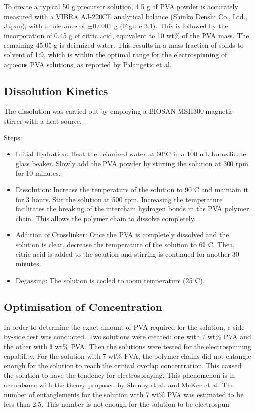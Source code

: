 \documentclass[12pt,a4paper]{report}
\begin{document}
To create a typical 50 g precursor solution, 4.5 g of PVA powder is accurately measured with a VIBRA AJ-220CE analytical balance (Shinko Denshi Co., Ltd., Japan), with a tolerance of \(\pm\)0.0001 g (Figure 3.1). This is followed by the incorporation of 0.45 g of citric acid, equivalent to 10 wt\% of the PVA mass. The remaining 45.05 g is deionized water. This results in a mass fraction of solids to solvent of 1:9, which is within the optimal range for the electrospinning of aqueous PVA solutions, as reported by Palangetic et al.\cite{46}



\subsection{Dissolution Kinetics}
The dissolution was carried out by employing a BIOSAN MSH300 magnetic stirrer with a heat source.

Steps:
\begin{itemize}
    \item Initial Hydration: Heat the deionized water at 60\(^\circ\)C in a 100 mL borosilicate glass beaker. Slowly add the PVA powder by stirring the solution at 300 rpm for 10 minutes.
    \item Dissolution: Increase the temperature of the solution to 90\(^\circ\)C and maintain it for 3 hours. Stir the solution at 500 rpm. Increasing the temperature facilitates the breaking of the interchain hydrogen bonds in the PVA polymer chain. This allows the polymer chain to dissolve completely. \cite{30,32}
    \item Addition of Crosslinker: Once the PVA is completely dissolved and the solution is clear, decrease the temperature of the solution to 60\(^\circ\)C. Then, citric acid is added to the solution and stirring is continued for another 30 minutes.
    \item Degassing: The solution is cooled to room temperature (25\(^\circ\)C).\cite{39}
\end{itemize}



\subsection{Optimisation of Concentration}
In order to determine the exact amount of PVA required for the solution, a side-by-side test was conducted. Two solutions were created: one with 7 wt\% PVA and the other with 9 wt\% PVA. Then the solutions were tested for the electrospinning capability. For the solution with 7 wt\% PVA, the polymer chains did not entangle enough for the solution to reach the critical overlap concentration. This caused the solution to have the tendency for electrospraying. This phenomenon is in accordance with the theory proposed by Shenoy et al.\cite{44} and McKee et al.\cite{45} The number of entanglements for the solution with 7 wt\% PVA was estimated to be less than 2.5. This number is not enough for the solution to be electrospun.
\end{document}

